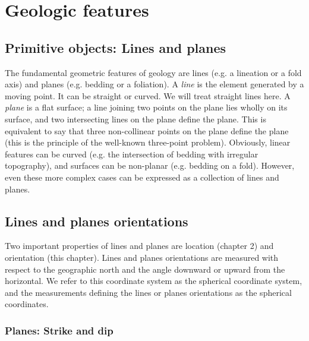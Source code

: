 \documentclass[a4paper , 12pt]{book}
\begin{document}
\chapter{Geologic features}

\section{Primitive objects: Lines and planes}

The fundamental geometric features of geology are lines (e.g. a lineation or a fold axis) and planes (e.g. bedding or a foliation). A \textit{line} is the element generated by a moving point. It can be straight or curved. We will treat straight lines here. A \textit{plane} is a flat surface; a line joining two points on the plane lies wholly on its surface, and two intersecting lines on the plane define the plane. This is equivalent to say that three non-collinear points on the plane define the plane (this is the principle of the well-known three-point problem). Obviously, linear features can be curved (e.g. the intersection of bedding with irregular topography), and surfaces can be non-planar (e.g. bedding on a fold). However, even these more complex cases can be expressed as a collection of lines and planes.

\section{Lines and planes orientations}

Two important properties of lines and planes are location (chapter 2) and orientation (this chapter). Lines and planes orientations are measured with respect to the geographic north and the angle downward or upward from the horizontal. We refer to this coordinate system as the spherical coordinate system, and the measurements defining the lines or planes orientations as the spherical coordinates.

\subsection{Planes: Strike and dip}
\end{document}
